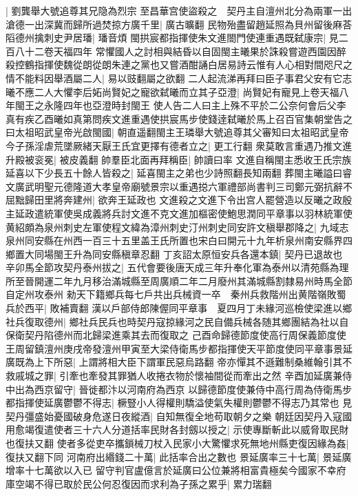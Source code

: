 |{
	劉龔舉大號追尊其兄隐為烈宗}
至昌華宫使盜殺之　契丹主自澶州北分為兩軍一出滄德一出深冀而歸所過焚掠方廣千里|{
	廣古曠翻}
民物殆盡留趙延照為貝州留後麻荅䧟德州擒刺史尹居璠|{
	璠音煩}
閩拱宸都指揮使朱文進閤門使連重遇既弑康宗|{
	見二百八十二卷天福四年}
常懼國人之討相與結昏以自固閩主曦果於誅殺嘗遊西園因醉殺控鶴指揮使魏從朗從朗朱連之黨也又嘗酒酣誦白居易詩云惟有人心相對間咫尺之情不能料因舉酒屬二人|{
	易以豉翻屬之欲翻}
二人起流涕再拜曰臣子事君父安有它志曦不應二人大懼李后妬尚賢妃之寵欲弑曦而立其子亞澄|{
	尚賢妃有寵見上卷天福八年閩王之永隆四年也亞澄時封閩王}
使人告二人曰主上殊不平於二公奈何會后父李真有疾乙酉曦如真第問疾文進重遇使拱宸馬步使錢逹弑曦於馬上召百官集朝堂告之曰太祖昭武皇帝光啟閩國|{
	朝直遥翻閩主王璘舉大號追尊其父審知曰太祖昭武皇帝}
今子孫淫虐荒墜厥緒天厭王氏宜更擇有德者立之|{
	更工行翻}
衆莫敢言重遇乃推文進升殿被衮冕|{
	被皮義翻}
帥羣臣北面再拜稱臣|{
	帥讀曰率}
文進自稱閩主悉收王氏宗族延喜以下少長五十餘人皆殺之|{
	延喜閩主之弟也少詩照翻長知兩翻}
葬閩主曦謚曰睿文廣武明聖元德隆道大孝皇帝廟號景宗以重遇搃六軍禮部尚書判三司鄭元弼抗辭不屈黜歸田里將奔建州|{
	欲奔王延政也}
文進殺之文進下令出宫人罷營造以反曦之政殷主延政遣統軍使吳成義將兵討文進不克文進加樞密使鮑思潤同平章事以羽林統軍使黄紹頗為泉州刺史左軍使程文緯為漳州刺史汀州刺史同安許文稹舉郡降之|{
	九域志泉州同安縣在州西一百三十五里盖王氏所置也宋白曰開元十九年析泉州南安縣界四鄉置大同場閩王升為同安縣稹章忍翻}
丁亥詔太原恒安兵各還本鎮|{
	契丹已退故也}
辛卯馬全節攻契丹泰州拔之|{
	五代會要後唐天成三年升奉化軍為泰州以清苑縣為理所至晉開運二年九月移治滿城縣至周廣順二年二月廢州其滿城縣割隸易州時馬全節自定州攻泰州}
勑天下籍鄉兵每七戶共出兵械資一卒　秦州兵救階州出黄階嶺敗蜀兵於西平|{
	敗補賣翻}
漢以戶部侍郎陳偓同平章事　夏四月丁未緣河巡檢使梁進以鄉社兵復取德州|{
	鄉社兵民兵也時契丹寇掠緣河之民自備兵械各随其鄉團結為社以自保衛契丹陷德州而北歸梁進乘其去而復取之}
己酉命歸德節度使高行周保義節度使王周留鎮澶州庚戌帝發澶州甲寅至大梁侍衛馬步都指揮使天平節度使同平章事景延廣既為上下所惡|{
	上謂將相大臣下謂軍民惡烏路翻}
帝亦憚其不遜難制桑維翰引其不救戚城之罪|{
	引牽也牽發其罪猶人收捲衣物於懷袖間從而牽出之然}
辛酉加延廣兼侍中出為西京留守|{
	晉徙都汴以河南府為西京}
以歸德節度使兼侍中高行周為侍衛馬步都指揮使延廣鬱鬱不得志|{
	橛豎小人得權則驕溢使氣失權則鬱鬱不得志乃其常也}
見契丹彊盛始憂國破身危遂日夜縱酒|{
	自知無復全地苟取朝夕之樂}
朝廷因契丹入寇國用愈竭復遣使者三十六人分道括率民財各封劔以授之|{
	示使專斷斬此以威脅取民財也復扶又翻}
使者多從吏卒攜鎖械刀杖入民家小大驚懼求死無地州縣吏復因緣為姦|{
	復扶又翻下同}
河南府出緡錢二十萬|{
	此括率合出之數也}
景延廣率三十七萬|{
	景延廣增率十七萬欲以入已}
留守判官盧億言於延廣曰公位兼將相富貴極矣今國家不幸府庫空竭不得已取於民公何忍復因而求利為子孫之累乎|{
	累力瑞翻}
